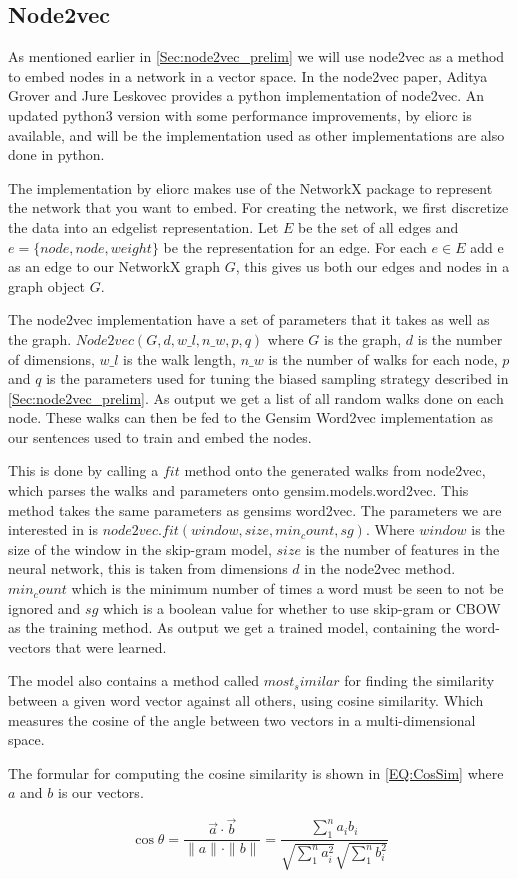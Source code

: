 \subsection{Node2vec}

As mentioned earlier in \ref{Sec:node2vec_prelim} we will use node2vec as a method to embed nodes in a network in a vector space. In the node2vec paper, Aditya Grover and Jure Leskovec provides a python implementation of node2vec. An updated python3 version with some performance improvements, by eliorc\cite{n2v.eliorc} is available, and will be the implementation used as other implementations are also done in python.

The implementation by eliorc makes use of the NetworkX package to represent the network that you want to embed. For creating the network, we first discretize the data into an edgelist representation. Let $E$ be the set of all edges and $e = \{node, node, weight\}$ be the representation for an edge. For each $e \in E$ add e as an edge to our NetworkX graph $G$, this gives us both our edges and nodes in a graph object $G$.

The node2vec implementation have a set of parameters that it takes as well as the graph. $Node2vec(G, d, w\_l, n\_w, p, q)$ where $G$ is the graph, $d$ is the number of dimensions, $w\_l$ is the walk length, $n\_w$ is the number of walks for each node, $p$ and $q$ is the parameters used for tuning the biased sampling strategy described in \ref{Sec:node2vec_prelim}. As output we get a list of all random walks done on each node. These walks can then be fed to the Gensim Word2vec\cite{Gensim.Word2vec} implementation as our sentences used to train and embed the nodes.

This is done by calling a $fit$ method onto the generated walks from node2vec, which parses the walks and parameters onto gensim.models.word2vec\cite{Gensim.Word2vec}. This method takes the same parameters as gensims word2vec. The parameters we are interested in is $node2vec.fit(window, size, min_count, sg)$. Where $window$ is the size of the window in the skip-gram model, $size$ is the number of features in the neural network, this is taken from dimensions $d$ in the node2vec method. $min_count$ which is the minimum number of times a word must be seen to not be ignored and $sg$ which is a boolean value for whether to use skip-gram or CBOW as the training method. As output we get a trained model, containing the word-vectors that were learned.

The model also contains a method called $most_similar$ for finding the similarity between a given word vector against all others, using cosine similarity. Which measures the cosine of the angle between two vectors in a multi-dimensional space.

The formular for computing the cosine similarity is shown in \ref{EQ:CosSim} where $a$ and $b$ is our vectors.

\begin{equation}\label{EQ:CosSim}
\cos\theta = 
\frac{\vec{a}\cdot\vec{b}}{\parallel a\parallel
\cdot\parallel b\parallel} = 
\frac{\sum_1^n a_i b_i}{\sqrt{\sum_1^n a_i^2}\sqrt{\sum_1^n b_i^2}}
\end{equation}
